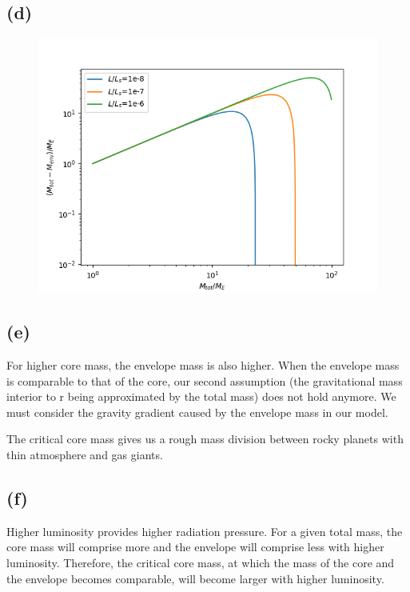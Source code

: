 \documentclass[a4paper,12pt]{article}
\begin{document}
\subsection*{(d)}
\begin{figure}[htbp]
    \centering
    \includegraphics*[width=12cm]{e5.png}
\end{figure}

\subsection*{(e)}
For higher core mass, the envelope mass is also higher. When the envelope mass is comparable to that of the 
core, our second assumption (the gravitational mass interior to r being approximated by the total mass) does not 
hold anymore. We must consider the gravity gradient caused by the envelope mass in our model.

The critical core mass gives us a rough mass division between rocky planets with thin atmosphere and gas giants.

\subsection*{(f)}
Higher luminosity provides higher radiation pressure. For a given total mass, the core mass will comprise more and the 
envelope will comprise less with higher luminosity. Therefore, the critical core mass, at which the mass of the core 
and the envelope becomes comparable, will become larger with higher luminosity.
\end{document}
